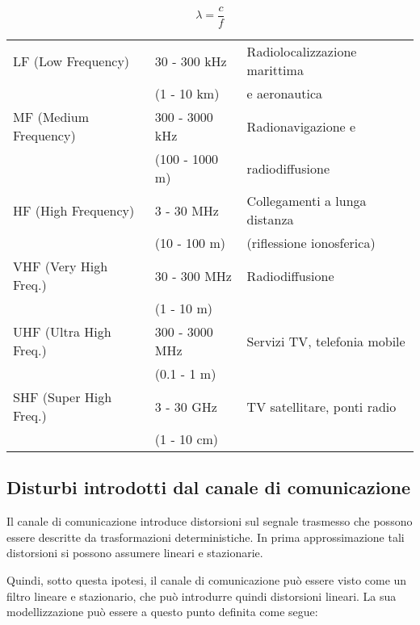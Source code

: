 \documentclass{article}
\begin{document}
\[
\lambda = \frac{c}{f}
\]

\begin{tabular}{lll}
LF (Low Frequency) & 30 - 300 kHz & Radiolocalizzazione marittima \\
 & (1 - 10 km) & e aeronautica \\
MF (Medium Frequency) & 300 - 3000 kHz & Radionavigazione e \\
 & (100 - 1000 m) & radiodiffusione \\
HF (High Frequency) & 3 - 30 MHz & Collegamenti a lunga distanza \\
 & (10 - 100 m) & (riflessione ionosferica) \\
VHF (Very High Freq.) & 30 - 300 MHz & Radiodiffusione \\
 & (1 - 10 m) & \\
UHF (Ultra High Freq.) & 300 - 3000 MHz & Servizi TV, telefonia mobile \\
 & (0.1 - 1 m) & \\
SHF (Super High Freq.) & 3 - 30 GHz & TV satellitare, ponti radio \\
 & (1 - 10 cm) & \\
\end{tabular}


\subsection*{
    Disturbi introdotti dal canale di comunicazione
}
Il canale di comunicazione introduce distorsioni sul segnale trasmesso che possono essere descritte da trasformazioni deterministiche. In prima approssimazione tali distorsioni si possono assumere lineari e stazionarie.


Quindi, sotto questa ipotesi, il canale di comunicazione può essere visto come un filtro lineare e stazionario, che può introdurre quindi distorsioni lineari. La sua modellizzazione può essere a questo punto definita come segue:
\begin{center}
\end{center}
\end{document}
